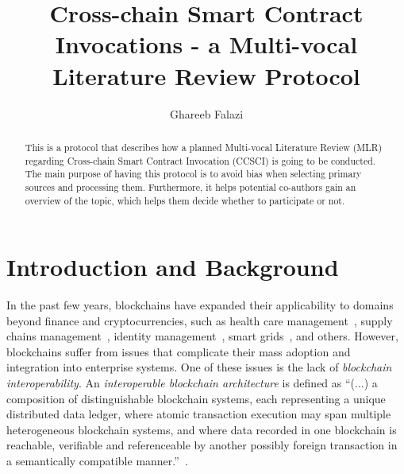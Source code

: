 \documentclass[review]{elsarticle}
\begin{document}
\begin{frontmatter}

\title{Cross-chain Smart Contract Invocations - a Multi-vocal Literature Review Protocol}


\author[iaas]{Ghareeb Falazi}
\address[iaas]{Universit\"atsstra\ss{}e 38, 70569 Stuttgart}


\begin{abstract}
This is a protocol that describes how a planned Multi-vocal Literature Review (MLR) regarding Cross-chain Smart Contract Invocation (CCSCI) is going to be conducted.
The main purpose of having this protocol is to avoid bias when selecting primary sources and processing them.
Furthermore, it helps potential co-authors gain an overview of the topic, which helps them decide whether to participate or not.
\end{abstract}


\end{frontmatter}

\tableofcontents

\linenumbers

\section{Introduction and Background}
\label{sec:introduction-and-background}
In the past few years, blockchains have expanded their applicability to domains beyond finance and cryptocurrencies, such as health care management~\cite{Tuli2020Healthcare}, supply chains management~\cite{Montecchi2019SupplyChains}, identity management~\cite{Zhu2018IdentityManagement}, smart grids~\cite{Pop2018SmartGrid}, and others.
However, blockchains suffer from issues that complicate their mass adoption and integration into enterprise systems.
One of these issues is the lack of \emph{blockchain interoperability}.
An \emph{interoperable blockchain architecture} is defined as \enquote{(...) a composition of distinguishable blockchain systems, each representing a unique distributed data ledger, where atomic transaction execution may span multiple heterogeneous blockchain systems, and where data recorded in one blockchain is reachable, verifiable and referenceable by another possibly foreign transaction in a semantically compatible manner.}~\cite{Hardjon2020Interoperability}.
\end{document}
